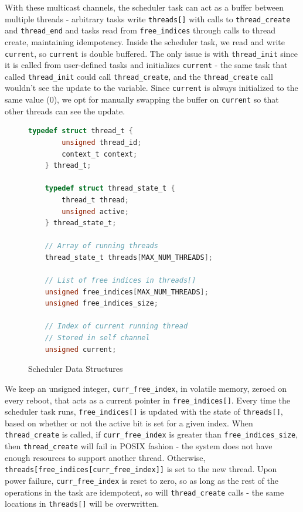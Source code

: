 \documentclass[11pt]{sensys-proc}
\begin{document}
With these multicast channels, the scheduler task can act as a buffer between
multiple threads - arbitrary tasks write \texttt{threads[]} with calls to
\texttt{thread\_create} and \texttt{thread\_end} and tasks read from
\texttt{free\_indices} through calls to thread create, maintaining
idempotency. Inside the scheduler task, we read and write \texttt{current},
so \texttt{current} is double buffered. The only issue is with
\texttt{thread\_init} since it is called from user-defined tasks and
initializes \texttt{current} - the same task that called \texttt{thread\_init}
could call \texttt{thread\_create}, and the \texttt{thread\_create} call
wouldn't see the update to the variable. Since \texttt{current} is always
initialized to the same value (0), we opt for manually swapping the buffer on
\texttt{current} so that other threads can see the update.

\begin{figure}[ht]
\begin{minipage}[b]{.9\columnwidth}
\begin{lstlisting}[language=C]
    typedef struct thread_t {
        unsigned thread_id;
        context_t context;
    } thread_t;

    typedef struct thread_state_t {
        thread_t thread;
        unsigned active;
    } thread_state_t;

    // Array of running threads
    thread_state_t threads[MAX_NUM_THREADS];

    // List of free indices in threads[]
    unsigned free_indices[MAX_NUM_THREADS];
    unsigned free_indices_size;

    // Index of current running thread
    // Stored in self channel
    unsigned current;
\end{lstlisting}
\caption{Scheduler Data Structures}\label{schDataStruct}
\end{minipage}
\end{figure}

We keep an unsigned integer, \texttt{curr\_free\_index}, in volatile memory,
zeroed on every reboot, that acts as a current pointer in
\texttt{free\_indices[]}. Every time the scheduler task runs,
\texttt{free\_indices[]} is updated with the state of \texttt{threads[]},
based on whether or not the active bit is set for a given index. When
\texttt{thread\_create} is called, if \texttt{curr\_free\_index} is greater
than \texttt{free\_indices\_size}, then \texttt{thread\_create} will fail in
POSIX fashion - the system does not have enough resources to support another
thread. Otherwise, \texttt{threads[free\_indices[curr\_free\_index]]} is set
to the new thread. Upon power failure, \texttt{curr\_free\_index} is reset to
zero, so as long as the rest of the operations in the task are idempotent, so
will \texttt{thread\_create} calls - the same locations in \texttt{threads[]}
will be overwritten.
\end{document}
